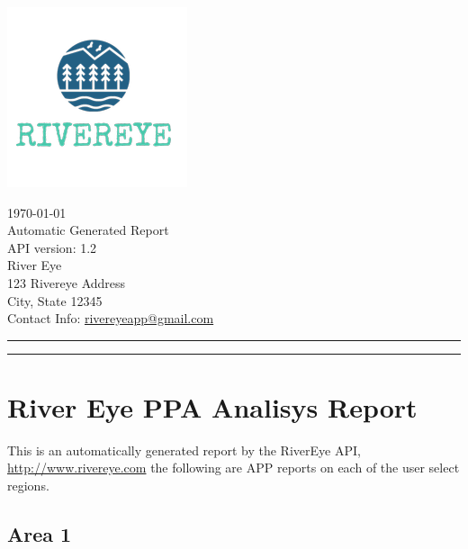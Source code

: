 \documentclass{article}
\begin{document}
    \begin{minipage}{0.6\linewidth}
        \includegraphics[width=0.7\linewidth]{LogoRiverEye.jpg}
    \end{minipage}\hfil
    \begin{minipage}{0.4\linewidth}
        \today \bigskip \\
        Automatic Generated Report \\
        API version: {1.2} \\
        River Eye \\
        123 Rivereye Address \\
        City, State 12345 \\
        Contact Info: \href{mailto:rivereyeapp@gmail.com}{rivereyeapp@gmail.com} \\

    
    \end{minipage}
    \vspace{-3em}

    \rule{\linewidth}{1pt}
    \rule{\linewidth}{1pt}

    \hfill


    \section{River Eye PPA Analisys Report}
    This is an automatically generated report by the RiverEye API, \url{http://www.rivereye.com} the following are APP reports on each of the user select regions.
    \bigskip

    \subsection{Area 1}
\end{document}
